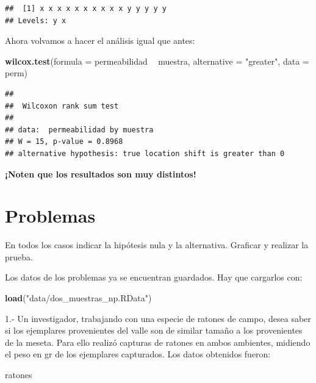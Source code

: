 \documentclass[]{book}
\newenvironment{Shaded}{\begin{snugshade}}{\end{snugshade}}
\newcommand{\DataTypeTok}[1]{\textcolor[rgb]{0.13,0.29,0.53}{#1}}
\newcommand{\KeywordTok}[1]{\textcolor[rgb]{0.13,0.29,0.53}{\textbf{#1}}}
\newcommand{\NormalTok}[1]{#1}
\newcommand{\OperatorTok}[1]{\textcolor[rgb]{0.81,0.36,0.00}{\textbf{#1}}}
\newcommand{\StringTok}[1]{\textcolor[rgb]{0.31,0.60,0.02}{#1}}
\theoremstyle{definition}
\theoremstyle{definition}
\theoremstyle{definition}
\theoremstyle{remark}
\begin{document}
\begin{verbatim}
##  [1] x x x x x x x x x x y y y y y
## Levels: y x
\end{verbatim}

Ahora volvamos a hacer el análisis igual que antes:

\begin{Shaded}
\begin{Highlighting}[]
\KeywordTok{wilcox.test}\NormalTok{(}\DataTypeTok{formula =}\NormalTok{ permeabilidad }\OperatorTok{~}\StringTok{ }\NormalTok{muestra, }\DataTypeTok{alternative =} \StringTok{"greater"}\NormalTok{, }\DataTypeTok{data =}\NormalTok{ perm)}
\end{Highlighting}
\end{Shaded}

\begin{verbatim}
## 
##  Wilcoxon rank sum test
## 
## data:  permeabilidad by muestra
## W = 15, p-value = 0.8968
## alternative hypothesis: true location shift is greater than 0
\end{verbatim}

\textbf{¡Noten que los resultados son muy distintos!}

\hypertarget{problemas-1}{%
\section{Problemas}\label{problemas-1}}

En todos los casos indicar la hipótesis nula y la alternativa. Graficar
y realizar la prueba.

Los datos de los problemas ya se encuentran guardados. Hay que cargarlos
con:

\begin{Shaded}
\begin{Highlighting}[]
\KeywordTok{load}\NormalTok{(}\StringTok{"data/dos_muestras_np.RData"}\NormalTok{)}
\end{Highlighting}
\end{Shaded}

1.- Un investigador, trabajando con una especie de ratones de campo,
desea saber si los ejemplares provenientes del valle son de similar
tamaño a los provenientes de la meseta. Para ello realizó capturas de
ratones en ambos ambientes, midiendo el peso en gr de los ejemplares
capturados. Los datos obtenidos fueron:

\begin{Shaded}
\begin{Highlighting}[]
\NormalTok{ratones}
\end{Highlighting}
\end{Shaded}
\end{document}
